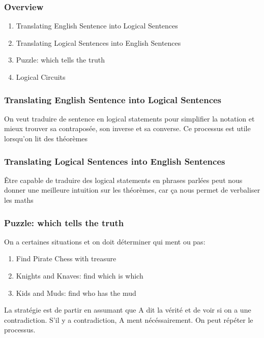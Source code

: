 \documentclass{article}
\begin{document}
\subsubsection{Overview}

\begin{enumerate}
    \item Translating English Sentence into Logical Sentences
    \item Translating Logical Sentences into English Sentences
    \item Puzzle: which tells the truth
    \item Logical Circuits
\end{enumerate}


\subsubsection{Translating English Sentence into Logical Sentences}

On veut traduire de sentence en logical statements pour simplifier la
notation et mieux trouver sa contraposée, son inverse et sa converse.
Ce processus est utile lorsqu'on lit des théorèmes

\subsubsection{Translating Logical Sentences into English Sentences}

Être capable de traduire des logical statements en phrases parlées
peut nous donner une meilleure intuition sur les théorèmes, car ça
nous permet de verbaliser les maths

\subsubsection{Puzzle: which tells the truth}

On a certaines situations et on doit déterminer qui ment ou pas:
\begin{enumerate}
    \item Find Pirate Chess with treasure
    \item Knights and Knaves: find which is which
    \item Kids and Muds: find who has the mud
\end{enumerate}

La stratégie est de partir en assumant que A dit la vérité et de voir
si on a une contradiction. S'il y a contradiction, A ment nécéssairement.
On peut répéter le processus.
\end{document}
